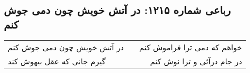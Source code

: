 \begin{center}
\section*{رباعی شماره ۱۲۱۵: در آتش خویش چون دمی جوش کنم}
\label{sec:1215}
\begin{longtable}{l p{0.5cm} r}
در آتش خویش چون دمی جوش کنم
&&
خواهم که دمی ترا فراموش کنم
\\
گیرم جانی که عقل بیهوش کند
&&
در جام درآئی و ترا نوش کنم
\\
\end{longtable}
\end{center}
